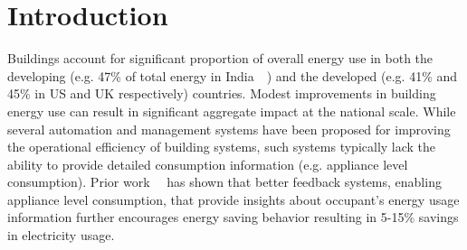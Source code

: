 \documentclass[conference]{IEEEtran}
\newcommand{\indicns}{INDiC}
\begin{document}
\begin{abstract}
Residential buildings contribute significantly to the overall energy consumption across most parts of the world. While smart monitoring and control of appliances can reduce the overall energy consumption, management and cost associated with such systems act as a big hindrance. %
Prior work has established that detailed feedback in the form of appliance level consumption to building occupants improves their awareness and paves the way for reduction in electricity consumption. Non-Intrusive Load Monitoring (NILM), i.e. the process of disaggregating the overall home electricity usage measured at the meter level into constituent appliances, provides a simple and cost effective methodology to provide such feedback to the occupants. In this paper we present \textbf{I}mproved \textbf{N}on-Intrusive load monitoring using load \textbf{Di}vision and \textbf{C}alibration (\indicns) that simplifies NILM by dividing the appliances across multiple instrumented points (meters/phases) and calibrating the measured power. Proposed approach is used together with the Combinatorial Optimization framework and evaluated on the popular REDD dataset. Empirical results demonstrate significant improvement in disaggregation accuracy, achieved by using \indicns.
\end{abstract}
\IEEEpeerreviewmaketitle


\vspace{-3mm}
\section{Introduction}
\vspace{-1mm}
\noindent Buildings account for significant proportion of overall energy use in both the developing (e.g. 47\% of total energy in India~~\cite{evans09}) and the developed (e.g. 41\% and 45\% in US and UK respectively) countries. Modest improvements in building energy use can result in significant aggregate impact at the national scale. While several automation and management systems have been proposed for improving the operational efficiency of building systems, such systems typically lack the ability to provide detailed consumption information (e.g. appliance level consumption). Prior work~~\cite{darby} has shown that better feedback systems, enabling appliance level consumption, that provide insights about occupant's energy usage information further encourages energy saving behavior resulting in 5-15\% savings in electricity usage.
\end{document}
